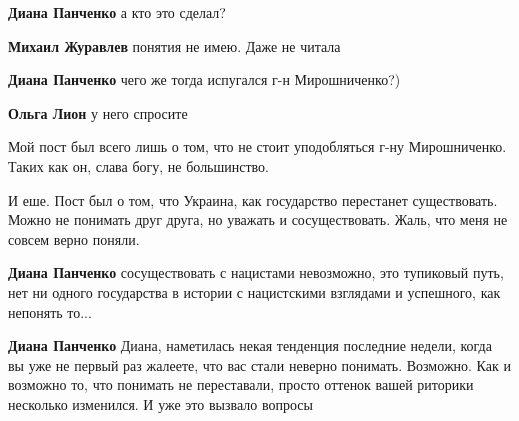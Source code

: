 \begin{itemize}
\begin{itemize}
\textbf{Диана Панченко} а кто это сделал?


 
\textbf{Михаил Журавлев} понятия не имею. Даже не читала

 
\textbf{Диана Панченко} чего же тогда испугался г-н Мирошниченко?)


 
\textbf{Ольга Лион} у него спросите

Мой пост был всего лишь о том, что не стоит уподобляться г-ну Мирошниченко.
Таких как он, слава богу, не большинство.

И еше. Пост был о том, что Украина, как государство перестанет существовать.
Можно не понимать друг друга, но уважать и сосуществовать.  Жаль, что меня не
совсем верно поняли.


 
\textbf{Диана Панченко} сосуществовать с нацистами невозможно, это тупиковый
путь, нет ни одного государства в истории с нацистскими взглядами и успешного,
как непонять то...

 
\textbf{Диана Панченко} Диана, наметилась некая тенденция последние недели,
когда вы уже не первый раз жалеете, что вас стали неверно понимать. Возможно.
Как и возможно то, что понимать не переставали, просто оттенок вашей риторики
несколько изменился. И уже это вызвало вопросы


\end{itemize}
\end{itemize}
